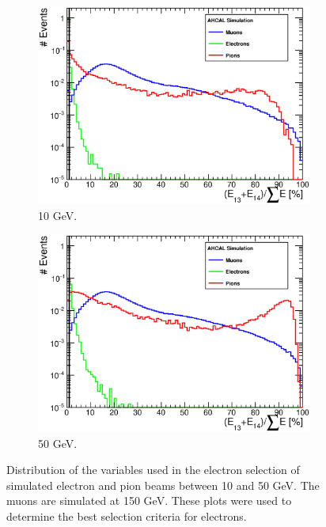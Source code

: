 \begin{figure}[htbp!]
\begin{subfigure}[t]{0.5\textwidth}
		\includegraphics[width=1\linewidth]{../Thesis_Plots/Timing/Electrons/Plots/SelectionCut_EnergyLastLayers_10GeV.eps}
		\caption{10 GeV.} \label{fig:e10GeV_Elast}
	\end{subfigure}
	\hfill
	\begin{subfigure}[t]{0.5\textwidth}
		\centering
		\includegraphics[width=1\linewidth]{../Thesis_Plots/Timing/Electrons/Plots/SelectionCut_EnergyLastLayers_50GeV.eps}
		\caption{50 GeV.} \label{fig:e50GeV_Elast}
	\end{subfigure}
	\caption{Distribution of the variables used in the electron selection of simulated electron and pion beams between 10 and 50 GeV. The muons are simulated at 150 GeV. These plots were used to determine the best selection criteria for electrons.} \label{fig:electronselection}
\end{figure}

